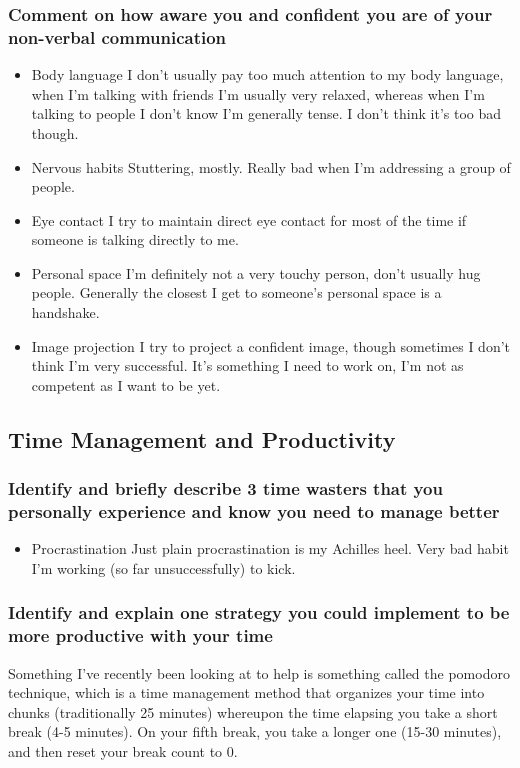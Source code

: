 \documentclass[11pt]{article}
\begin{document}
\subsubsection*{Comment on how aware you and confident you are of your non-verbal communication}
\label{sec:orgf54a076}
\begin{itemize}
\item Body language
\label{sec:org4e5d688}
I don't usually pay too much attention to my body language, when I'm talking with friends I'm usually very relaxed, whereas when I'm talking to people I don't know I'm generally tense. I don't think it's too bad though.
\item Nervous habits
\label{sec:orgab2daa8}
Stuttering, mostly. Really bad when I'm addressing a group of people. 
\item Eye contact
\label{sec:org59e5f2f}
I try to maintain direct eye contact for most of the time if someone is talking directly to me.
\item Personal space
\label{sec:org01e7fd1}
I'm definitely not a very touchy person, don't usually hug people. Generally the closest I get to someone's personal space is a handshake.
\item Image projection
\label{sec:org37a234b}
I try to project a confident image, though sometimes I don't think I'm very successful. It's something I need to work on, I'm not as competent as I want to be yet.
\end{itemize}
\subsection*{Time Management and Productivity}
\label{sec:org1767bbf}
\subsubsection*{Identify and briefly describe 3 time wasters that you personally experience and know you need to manage better}
\label{sec:org50ea9d0}
\begin{itemize}
\item Procrastination
\label{sec:orgc7d04bd}
Just plain procrastination is my Achilles heel. Very bad habit I'm working (so far unsuccessfully) to kick.
\end{itemize}
\subsubsection*{Identify and explain one strategy you could implement to be more productive with your time}
\label{sec:org7194164}
Something I've recently been looking at to help is something called the pomodoro technique, which is a time management method that organizes your time into chunks (traditionally 25 minutes) whereupon the time elapsing you take a short break (4-5 minutes). On your fifth break, you take a longer one (15-30 minutes), and then reset your break count to 0. 
\end{document}

